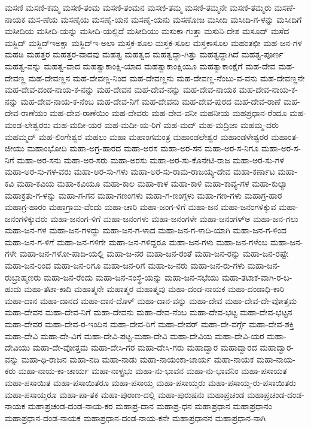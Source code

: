 ಮಸಣಿ
ಮಸಣಿ-ಕಮ್ಮ
ಮಸಣಿ-ತಂಮ
ಮಸಣಿ-ತಂಮನ
ಮಸಣಿ-ತಮ್ಮ
ಮಸಣಿ-ತಮ್ಮನೇ
ಮಸಣಿ-ತಮ್ಮರು
ಮಸಣೆ-ನಾಯಕ
ಮಸ-ಣೆಯ
ಮಸಣೈಯ
ಮಸಣೈ-ಯನ
ಮಸಣೈ-ಯನು
ಮಸಣೋಜ
ಮಸೀದಿ
ಮಸೀದಿ-ಗ-ಳನ್ನು
ಮಸೀದಿಗೆ
ಮಸೀದಿಯ
ಮಸೀದಿ-ಯನ್ನು
ಮಸೀದಿ-ಯಲ್ಲಿದೆ
ಮಸೀದಿಯು
ಮಸುಕಾ-ಗುತ್ತಾ
ಮಸುನಿ-ದೇಶ
ಮಸೂದ್
ಮಸೆದ
ಮಸ್ಜಿದ್
ಮಸ್ಜಿದ್ಇಅಕ್ಷಾ
ಮಸ್ಜಿದ್ಇ-ಅಲಾ
ಮಸ್ತಕ-ಶೂಲ
ಮಸ್ತಕ-ಸೂಲ
ಮಸ್ತಕಾಸೂಲ
ಮಹಂತಛೀ
ಮಹ-ಜನ-ಗಳ
ಮಹಡಿ
ಮಹತ್ತರ
ಮಹತ್ತರ-ವಾದವು
ಮಹತ್ವ
ಮಹತ್ವದ
ಮಹತ್ವದ್ದಾ-ಗಿತ್ತು
ಮಹತ್ವದ್ದಾಗಿದೆ
ಮಹತ್ವ-ಪೂರ್ಣ
ಮಹತ್ವ-ವನ್ನು
ಮಹತ್ವ-ವಾದ
ಮಹತ್ವಾಕಾಂಕ್ಷಿ-ಯಾದ
ಮಹತ್ವಾಕಾಂಕ್ಷಿಯೂ
ಮಹತ್ವಾಕಾಂಕ್ಷೆಗೆ
ಮಹ-ದೇವ
ಮಹ-ದೇವಣ್ಣ
ಮಹ-ದೇವಣ್ಣನ
ಮಹ-ದೇವಣ್ಣ-ನಿಂದ
ಮಹ-ದೇವಣ್ಣನು
ಮಹ-ದೇವಣ್ಣ-ನೆಂಬು-ವ-ವನು
ಮಹ-ದೇವಣ್ಣನೇ
ಮಹ-ದೇವ-ದಂಡ-ನಾಯ-ಕ-ನನ್ನು
ಮಹ-ದೇವನ
ಮಹ-ದೇವ-ನನ್ನು
ಮಹ-ದೇವ-ನಾಯಕ
ಮಹ-ದೇವ-ನಾಯ-ಕ-ನನ್ನು
ಮಹ-ದೇವ-ನಾಯ-ಕ-ನೆಂಬ
ಮಹ-ದೇವ-ನಿಗೆ
ಮಹ-ದೇವನು
ಮಹ-ದೇವ-ಪುರದ
ಮಹ-ದೇವ-ರಾಣೆ
ಮಹ-ದೇವ-ರಾಣೆಯಂ
ಮಹ-ದೇವ-ರಾಣೆಯಿಂ
ಮಹ-ದೇವರು
ಮಹ-ದೇವ-ವನೀ
ಮಹನೀಯ
ಮಹಪ್ರಧಾನ-ರೆಂದೂ
ಮಹ-ಮಂಡ-ಲೇಶ್ವರರು
ಮಹ-ಮದೀ-ಯರ
ಮಹ-ಮದೀ-ಯ-ರಿಗೆ
ಮಹ-ಮದ್
ಮಹ-ಮದ್ರಿಜಾ
ಮಹಮ್ಮ-ದರು
ಮಹಮ್ಮದ್
ಮಹ-ಲಿಂಗೇಶ್ವರ
ಮಹಲು
ಮಹಾ
ಮಹಾಂಗಮಂತ್ರ
ಮಹಾಂಡಲೇಶ್ವರ
ಮಹಾಂಡಳೇಶ್ವರರ
ಮಹಾಂತ-ಜೀಯು
ಮಹಾಂಭೋದಿ
ಮಹಾ-ಅಗ್ರ-ಹಾರದ
ಮಹಾ-ಅರಸ
ಮಹಾ-ಅರ-ಸನ
ಮಹಾ-ಅರ-ಸ-ನಿಗೂ
ಮಹಾ-ಅರ-ಸ-ನಿಗೆ
ಮಹಾ-ಅರ-ಸನು
ಮಹಾ-ಅರ-ಸರು
ಮಹಾ-ಅರಸು
ಮಹಾ-ಅರ-ಸು-ಕೊನೇಟಿ-ರಾಜ
ಮಹಾ-ಅರ-ಸು-ಗಳ
ಮಹಾ-ಅರ-ಸು-ಗಳ-ವರು
ಮಹಾ-ಅರ-ಸು-ಗಳು
ಮಹಾ-ಅರ-ಸು-ರಾಮ-ರಾಜಯ್ಯ-ದೇವ
ಮಹಾ-ಕರ್ಣಾಟ
ಮಹಾ-ಕವಿ
ಮಹಾ-ಕವಿಯ
ಮಹಾ-ಕವಿಯೂ
ಮಹಾ-ಕಾಲ
ಮಹಾ-ಕಾಳ
ಮಹಾ-ಕಾಳಿ
ಮಹಾ-ಕಾವ್ಯ-ಗಳ
ಮಹಾ-ಕುಲ್ಯಾ
ಮಹಾಕ್ರತು-ಗ-ಳನ್ನು
ಮಹಾ-ಗ-ಗನ
ಮಹಾ-ಗಣಂಗಳು
ಮಹಾ-ಗ-ಣಂಗ್ಗಳು
ಮಹಾ-ಗಣ-ಗಳು
ಮಹಾಗ್ರ-ಹಾರ
ಮಹಾಗ್ರ-ಹಾರಂ
ಮಹಾಗ್ರಾಮ-ವೆಂದು
ಮಹಾ-ಚಾರಿ
ಮಹಾ-ಜಂಗ-ಳಿಗೆ
ಮಹಾ-ಜನ
ಮಹಾ-ಜನಂಗಳಿಕ್ಕುವ
ಮಹಾ-ಜನಂಗಳಿಕ್ಕುವರು
ಮಹಾ-ಜನಂಗ-ಳಿಗೆ
ಮಹಾ-ಜನಂಗಳು
ಮಹಾ-ಜನಂಗಳೇ
ಮಹಾ-ಜನಂಗಳ್ಅ
ಮಹಾ-ಜನ-ಗಲು
ಮಹಾ-ಜನ-ಗಳ
ಮಹಾ-ಜನ-ಗಳದ್ದು
ಮಹಾ-ಜನ-ಗ-ಳಾದ
ಮಹಾ-ಜನ-ಗ-ಳಾದಿ-ಯಾಗಿ
ಮಹಾ-ಜನ-ಗ-ಳಿಂದ
ಮಹಾ-ಜನ-ಗ-ಳಿಗೆ
ಮಹಾ-ಜನ-ಗಳಿಗೇ
ಮಹಾ-ಜನ-ಗಳಿದ್ದರೂ
ಮಹಾ-ಜನ-ಗಳು
ಮಹಾ-ಜನ-ಗಳೆಂಬ
ಮಹಾ-ಜನ-ಗಳೇ
ಮಹಾ-ಜನ-ಗಳೋ-ಪಾದಿ-ಯಲ್ಲಿ
ಮಹಾ-ಜ-ನರ
ಮಹಾ-ಜನ-ರಂತೆ
ಮಹಾ-ಜನ-ರನ್ನು
ಮಹಾ-ಜನ-ರಷ್ಟೇ
ಮಹಾ-ಜನ-ರಿಂದ
ಮಹಾ-ಜನ-ರಿಗೂ
ಮಹಾ-ಜನ-ರಿಗೆ
ಮಹಾ-ಜ-ನರು
ಮಹಾ-ಜನ-ರು-ಗಳು
ಮಹಾ-ಜನ-ರುಬ್ರಾಹ್ಮಣರು
ಮಹಾ-ಜನ-ರೆಂದು
ಮಹಾ-ಜನ-ಸಂಸ್ಥೆ-ಯನ್ನು
ಮಹಾ-ಜನ-ಸಭೆಯು
ಮಹಾ-ತಟಾಕ-ವಾಗಿ-ರ-ಬ-ಹುದು
ಮಹಾ-ತಟಾ-ಕಾದಿ
ಮಹಾತ್ಮನೇ
ಮಹಾತ್ಮರ
ಮಹಾತ್ಮವು
ಮಹಾ-ದಂಡ-ನಾಯಕ
ಮಹಾ-ದಂಡಾಧಿ-ಕಾರಿ
ಮಹಾ-ದಾನ
ಮಹಾ-ದಾನದ
ಮಹಾ-ದಾನ-ದೊಳ್
ಮಹಾ-ದಾನ-ವನ್ನು
ಮಹಾ-ದೇವ
ಮಹಾ-ದೇವ-ದೇ-ವೋತ್ತಮ
ಮಹಾ-ದೇವನ
ಮಹಾ-ದೇವ-ನಿಗೆ
ಮಹಾ-ದೇವನು
ಮಹಾ-ದೇವ-ನೆಂಬ
ಮಹಾ-ದೇವ-ಭಟ್ಟ
ಮಹಾ-ದೇವ-ಭಟ್ಟನ
ಮಹಾ-ದೇವರ
ಮಹಾ-ದೇವ-ರ-ಇಂದಿನ
ಮಹಾ-ದೇವ-ರಿಗೆ
ಮಹಾ-ದೇವರ್
ಮಹಾ-ದೇ-ವರ್ಗ್ಗೆ
ಮಹಾ-ದೇವ-ಶಕ್ತಿ
ಮಹಾ-ದೇವಿ
ಮಹಾ-ದೇ-ವಿಗೆ
ಮಹಾ-ದೇವಿ-ಪಟ್ಟ-ಮಹಾ-ದೇವಿ
ಮಹಾ-ದೇವಿಯ
ಮಹಾ-ದೇವಿ-ಯರ
ಮಹಾ-ದೇವಿಯು
ಮಹಾ-ದೇ-ವೋತ್ತಮ
ಮಹಾ-ದೇಸಿ-ಗರ
ಮಹಾ-ದೇಸಿ-ಗರು
ಮಹಾದ್ವಾರ
ಮಹಾದ್ವಾರದ
ಮಹಾದ್ವಾರ-ವನ್ನು
ಮಹಾ-ಧಿ-ರಾಜನ
ಮಹಾ-ನದಿ
ಮಹಾ-ನಾಡು
ಮಹಾ-ನಾಯಂಕಾ-ಚಾರ್ಯ
ಮಹಾ-ನಾಯಕ
ಮಹಾ-ನಾಯ-ಕರು
ಮಹಾ-ನಾಯ-ಕಾ-ಚಾರ್ಯ
ಮಹಾ-ನಾಳ್ಪ್ರಭು
ಮಹಾ-ನು-ಭಾವನ
ಮಹಾ-ನು-ಭಾವನಿಂ
ಮಹಾ-ಪಸಾಯತ
ಮಹಾ-ಪಸಾಯಿತ
ಮಹಾ-ಪಸಾಯಿತರೂ
ಮಹಾ-ಪಸಾಯ್ತ
ಮಹಾ-ಪಸಾಯ್ತರು
ಮಹಾ-ಪಸಾಯ್ತ-ರು-ಪಸಾಯಿತರು
ಮಹಾ-ಪಸಾಯ್ತರೂ
ಮಹಾ-ಪಾ-ತಕ
ಮಹಾ-ಪುರಾಣ-ದಲ್ಲಿ
ಮಹಾ-ಪುರುಷನು
ಮಹಾಪ್ರಚಂಡ
ಮಹಾಪ್ರಚಂಡ-ದಂಡ-ನಾಯಕ
ಮಹಾಪ್ರಚಂಡ-ದಂಡ-ನಾಯ-ಕರ
ಮಹಾಪ್ರ-ದಾನ
ಮಹಾಪ್ರ-ಧನ
ಮಹಾಪ್ರಧಾನ
ಮಹಾಪ್ರಧಾನಂ
ಮಹಾಪ್ರಧಾನ-ದಂಡ-ನಾಯಕ
ಮಹಾಪ್ರಧಾನ-ದಂಡ-ನಾಯ-ಕನೇ
ಮಹಾಪ್ರಧಾನನ
ಮಹಾಪ್ರಧಾನ-ನಾಗಿ
